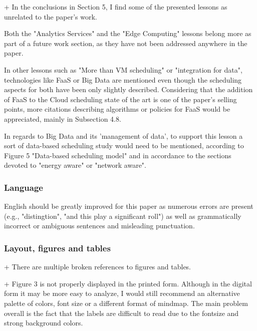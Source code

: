 + In the conclusions in Section 5, I find some of the presented
lessons as unrelated to the paper's work. 

Both the "Analytics
Services" and the "Edge Computing" lessons belong more as part of a
future work section, as they have not been addressed anywhere in the
paper. 



In other lessons such as "More than VM scheduling" or
"integration for data", technologies like FaaS or Big Data are
mentioned even though the scheduling aspects for both have been only
slightly described. Considering that the addition of FaaS to the Cloud
scheduling state of the art is one of the paper's selling points, more
citations describing algorithms or policies for FaaS would be
appreciated, mainly in Subsection 4.8. 


In regards to Big Data and its
'management of data', to support this lesson a sort of data-based
scheduling study would need to be mentioned, according to Figure 5
"Data-based scheduling model" and in accordance to the sections
devoted to "energy aware" or "network aware".




\subsubsection{Language}

English should be greatly improved for this paper as numerous errors
are present (e.g., "distingtion", "and this play a significant roll")
as well as grammatically incorrect or ambiguous sentences and
misleading punctuation.



\subsubsection{Layout, figures and tables}

+ There are multiple broken references to figures and tables.


+ Figure 3 is not properly displayed in the printed form. Although in
the digital form it may be more easy to analyze, I would still
recommend an alternative palette of colors, font size or a different
format of mindmap. The main problem overall is the fact that the
labels are difficult to read due to the fontsize and strong background
colors.



